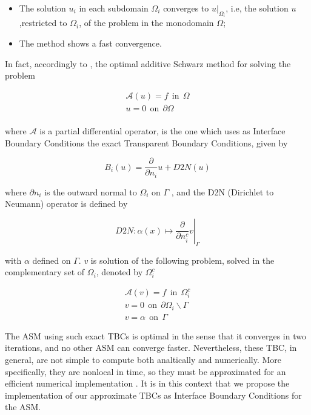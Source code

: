 \begin{itemize}
\item The solution $u_i$ in each subdomain $\Omega_i$ converges to $u|_{\Omega_i}$, i.e, the solution $u$,restricted to $\Omega_i$, of the problem in the monodomain $\Omega$;
\item The method shows a fast convergence.
\end{itemize} 

\indent In fact, accordingly to \cite{Japhet2003}, the optimal additive Schwarz method for solving the problem 

\begin{gather*}
\mathcal{A}(u) = f \ \ \text{in} \ \ \Omega\\
u = 0 \ \ \text{on} \ \ \partial\Omega\\
\end{gather*}

\noindent where $\mathcal{A}$ is a partial differential operator, is the one which uses as Interface Boundary Conditions the exact Transparent Boundary Conditions, given by

$$B_i(u) = \frac{\partial}{\partial n_i}u + D2N(u)$$

\noindent where $\partial n_i$ is the outward normal to $\Omega_i$ on $\Gamma$ , and the D2N (Dirichlet to Neumann) operator is defined by

$$\left. D2N : \alpha(x) \mapsto \frac{\partial}{\partial n_i^c}v \right\rvert_\Gamma$$

\noindent with $\alpha$ defined on $\Gamma$. $v$ is solution of the following problem, solved in the complementary set of $\Omega_i$, denoted by $\Omega_i^c$

\begin{gather*}
\mathcal{A}(v) = f \ \ \text{in} \ \ \Omega_i^c\\
v = 0 \ \ \text{on} \ \ \partial \Omega_i \backslash \Gamma \\
v = \alpha \ \ \text{on} \ \ \Gamma
\end{gather*}

\indent The ASM using such exact TBCs is optimal in the sense that it converges in two iterations, and no other ASM can converge faster. Nevertheless, these TBC, in general, are not simple to compute both analtically and numerically. More specifically, they are nonlocal in time, so they must be approximated for an efficient numerical implementation \cite{Xavieretal2008}. It is in this context that we propose the implementation of our approximate TBCs as Interface Boundary Conditions for the ASM.

